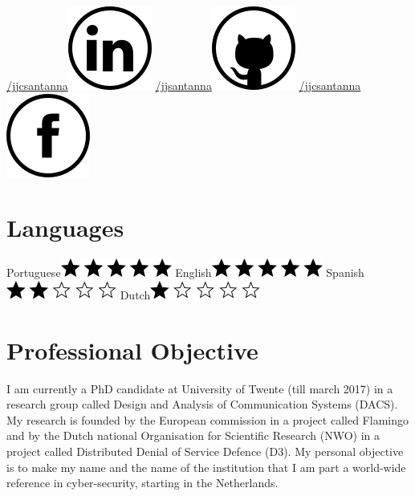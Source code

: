 \documentclass[print]{styles/friggeri-cv-linux} %
\begin{document}
\begin{aside}
\href{https://www.linkedin.com/in/jjcsantanna}{/jjcsantanna}\includegraphics[scale=0.3]{img/linkedin.png}
\href{https://github.com/jjsantanna}{/jjsantanna\includegraphics[scale=0.3]{img/github.png}}
\href{https://www.facebook.com/jjcsantanna}{/jjcsantanna}\includegraphics[scale=0.3]{img/facebook.png}
~
\section{Languages}
Portuguese\includegraphics[scale=0.40]{img/5stars.png}
English\includegraphics[scale=0.40]{img/5stars.png}
Spanish\includegraphics[scale=0.40]{img/2stars.png}
Dutch\includegraphics[scale=0.40]{img/1star.png}
\end{aside}

\section{Professional Objective}
I am currently a PhD candidate at University of Twente (till march 2017) in a
research group called Design and Analysis of Communication Systems (DACS). My
research is founded by the European commission in a project called Flamingo and
by the Dutch national Organisation for Scientific Research (NWO) in a project
called Distributed Denial of Service Defence (D3). My personal objective is to
make my name and the name of the institution that I am part a world-wide
reference in cyber-security, starting in the Netherlands. 
\end{document}
